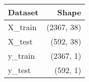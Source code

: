 \begin{tabular}{|l|r|}
\hline
\textbf{Dataset} & \textbf{Shape} \\
\hline
X\_train & (2367, 38) \\
X\_test & (592, 38) \\
y\_train & (2367, 1) \\
y\_test & (592, 1) \\
\hline
\end{tabular}
